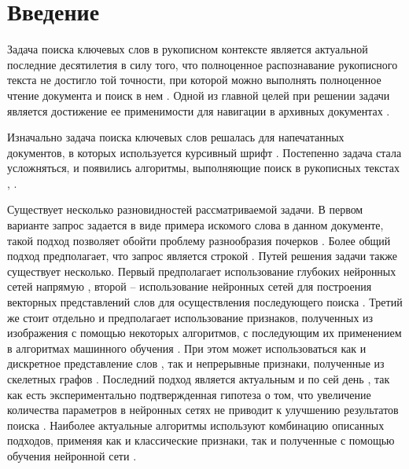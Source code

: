 \documentclass{article}
\begin{document}
\section{Введение}
\par Задача поиска ключевых слов в рукописном контексте является актуальной последние десятилетия в силу того, что полноценное распознавание рукописного текста не достигло той точности, при которой можно выполнять полноценное чтение документа и поиск в нем \citep{10.1007/978-3-031-36616-1_15, SOUIBGUI202243}. Одной из главной целей при решении задачи является достижение ее применимости для навигации в архивных документах \citep{10.1007/978-3-319-13695-0_74, 7333824}. 
\par Изначально задача поиска ключевых слов решалась для напечатанных документов, в которых используется курсивный шрифт \citep{627095}. Постепенно задача стала усложняться, и появились алгоритмы, выполняющие поиск в рукописных текстах \citep{1211511}, .
\par Существует несколько разновидностей рассматриваемой задачи. В первом варианте запрос задается в виде примера искомого слова в данном документе, такой подход позволяет обойти проблему разнообразия почерков \citep{7333824, 8378004}. Более общий подход предполагает, что запрос является строкой \citep{retsinas2021from}. Путей решения задачи также существует несколько. Первый предполагает использование глубоких нейронных сетей напрямую \citep{10.1007/978-3-031-41676-7_26, 10.1007/978-3-031-06555-2_26, Cascianelli2022}, второй -- использование нейронных сетей для построения векторных представлений слов для осуществления последующего поиска \citep{retsinas2021from, Krishnan2023, jemni2023stkeys}. Третий же стоит отдельно и предполагает использование признаков, полученных из изображения с помощью некоторых алгоритмов, с последующим их применением в алгоритмах машинного обучения \citep{8270021, 7333824, 10.1007/978-3-319-49055-7_50, ameri2017keyword, yousfi2021keyword, kundu2021hough}. При этом может использоваться как и дискретное представление слов \citep{8270021, yousfi2021keyword, kundu2021hough, stauffer2016graph}, так и непрерывные признаки, полученные из скелетных графов \citep{7333824, ameri2017keyword, stauffer2016graph}. Последний подход является актуальным и по сей день \citep{yousfi2021keyword, kundu2021hough, banerjee2022z}, так как есть экспериментально подтвержденная гипотеза о том, что увеличение количества параметров в нейронных сетях не приводит к улучшению результатов поиска \citep{rusakov2018expolring}. Наиболее актуальные алгоритмы используют комбинацию описанных подходов, применяя как и классические признаки, так и полученные с помощью обучения нейронной сети \citep{jemni2023stkeys, omayio2023word}.
\end{document}
